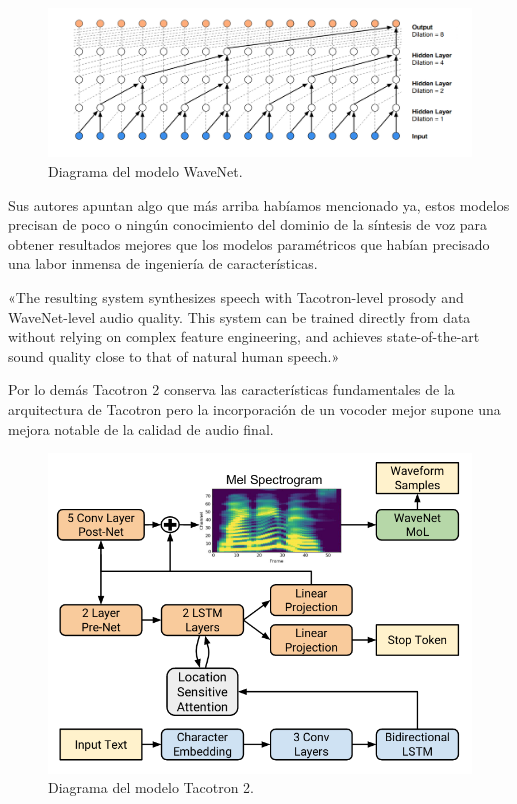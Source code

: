 \begin{figure}[H]
\centering
\includegraphics[width=14cm]{4_estado_del_arte_img/wavenet_0.png}
\caption{Diagrama del modelo WaveNet.}
\label{fig:figure1}
\end{figure}

Sus autores apuntan algo que más arriba habíamos mencionado ya, estos modelos precisan de poco o ningún conocimiento del dominio de la síntesis de voz para obtener resultados mejores que los modelos paramétricos que habían precisado una labor inmensa de ingeniería de características.

\begin{displayquote}
«The resulting system synthesizes speech with Tacotron-level prosody and WaveNet-level audio quality. This system can be trained directly from data without relying on complex feature engineering, and achieves state-of-the-art sound quality close to that of natural human speech.»
\end{displayquote}

Por lo demás Tacotron 2 conserva las características fundamentales de la arquitectura de Tacotron pero la incorporación de un vocoder mejor supone una mejora notable de la calidad de audio final. 


\begin{figure}[H]
\centering
\includegraphics[width=12cm]{4_estado_del_arte_img/tacotron2_0.png}
\caption{Diagrama del modelo Tacotron 2.}
\label{fig:figure1}
\end{figure}


